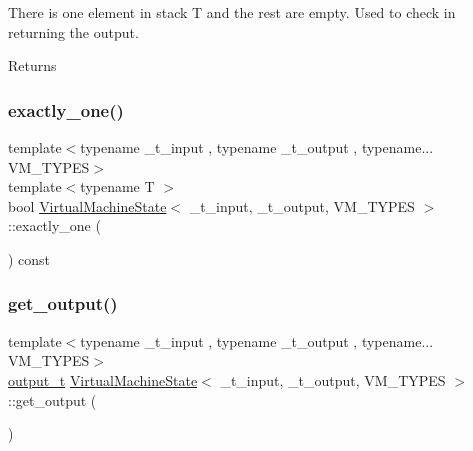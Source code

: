 There is one element in stack T and the rest are empty. Used to check in returning the output. 

\begin{DoxyReturn}{Returns}

\end{DoxyReturn}
\mbox{\label{class_virtual_machine_state_acbb3a56764c79f6952ffed7a13397cd1}} 
\subsubsection{\texorpdfstring{exactly\+\_\+one()}{exactly\_one()}}
{\footnotesize\ttfamily template$<$typename \+\_\+t\+\_\+input , typename \+\_\+t\+\_\+output , typename... V\+M\+\_\+\+T\+Y\+P\+ES$>$ \\
template$<$typename T $>$ \\
bool \hyperlink{class_virtual_machine_state}{Virtual\+Machine\+State}$<$ \+\_\+t\+\_\+input, \+\_\+t\+\_\+output, V\+M\+\_\+\+T\+Y\+P\+ES $>$\+::exactly\+\_\+one (\begin{DoxyParamCaption}{ }\end{DoxyParamCaption}) const\hspace{0.3cm}{\ttfamily [inline]}}

\mbox{\label{class_virtual_machine_state_ac2802775f8a7753dedf0363f83df4d03}} 
\subsubsection{\texorpdfstring{get\+\_\+output()}{get\_output()}}
{\footnotesize\ttfamily template$<$typename \+\_\+t\+\_\+input , typename \+\_\+t\+\_\+output , typename... V\+M\+\_\+\+T\+Y\+P\+ES$>$ \\
\hyperlink{class_virtual_machine_state_a1015cee5061f82f82ef6a953b51f9bd5}{output\+\_\+t} \hyperlink{class_virtual_machine_state}{Virtual\+Machine\+State}$<$ \+\_\+t\+\_\+input, \+\_\+t\+\_\+output, V\+M\+\_\+\+T\+Y\+P\+ES $>$\+::get\+\_\+output (\begin{DoxyParamCaption}{ }\end{DoxyParamCaption})\hspace{0.3cm}{\ttfamily [inline]}}



